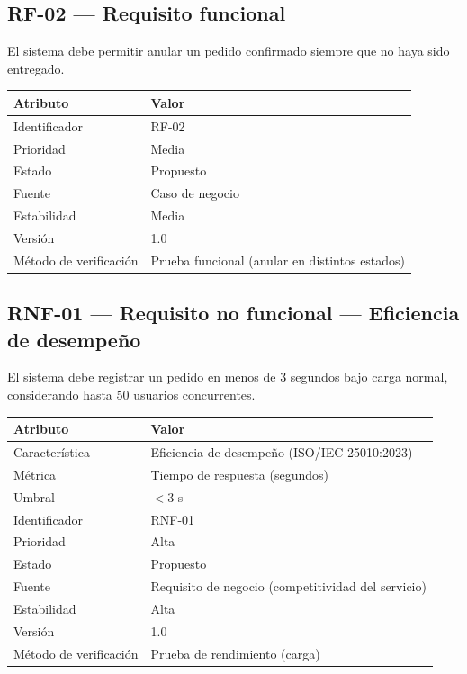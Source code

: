 \documentclass[12pt,a4paper]{article}
\begin{document}
\subsection{RF-02 — Requisito funcional}

El sistema debe permitir anular un pedido confirmado siempre que no haya sido entregado.

\begin{longtable}{p{5cm}p{9cm}}
\toprule
\textbf{Atributo} & \textbf{Valor} \\
\midrule
Identificador & RF-02 \\
Prioridad & Media \\
Estado & Propuesto \\
Fuente & Caso de negocio \\
Estabilidad & Media \\
Versión & 1.0 \\
Método de verificación & Prueba funcional (anular en distintos estados) \\
\bottomrule
\end{longtable}

\subsection{RNF-01 — Requisito no funcional — Eficiencia de desempeño}

El sistema debe registrar un pedido en menos de 3 segundos bajo carga normal, considerando hasta 50 usuarios concurrentes.

\begin{longtable}{p{5cm}p{9cm}}
\toprule
\textbf{Atributo} & \textbf{Valor} \\
\midrule
Característica & Eficiencia de desempeño (ISO/IEC 25010:2023) \\
Métrica & Tiempo de respuesta (segundos) \\
Umbral & $<3$ s \\
Identificador & RNF-01 \\
Prioridad & Alta \\
Estado & Propuesto \\
Fuente & Requisito de negocio (competitividad del servicio) \\
Estabilidad & Alta \\
Versión & 1.0 \\
Método de verificación & Prueba de rendimiento (carga) \\
\bottomrule
\end{longtable}
\end{document}
